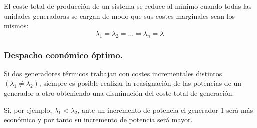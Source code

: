 				El coste total de producción de un sistema se reduce al mínimo cuando todas las unidades generadoras se cargan de modo que sus costes marginales sean los mismos: 
				\[\lambda_1 = \lambda_2 = \dots = \lambda_n = \lambda\]
				
			\subsubsection{Despacho económico óptimo.}
				Si dos generadores térmicos trabajan con costes incrementales distintos $(\lambda_1 \neq \lambda_2)$, siempre es posible realizar la reasignación de las potencias de un generador a otro obteniendo una disminución del coste total de generación.
				
				
				Si, por ejemplo, $\lambda_1 < \lambda_2$, ante un incremento de potencia el generador 1 será más económico y por tanto su incremento de potencia será mayor.
				
